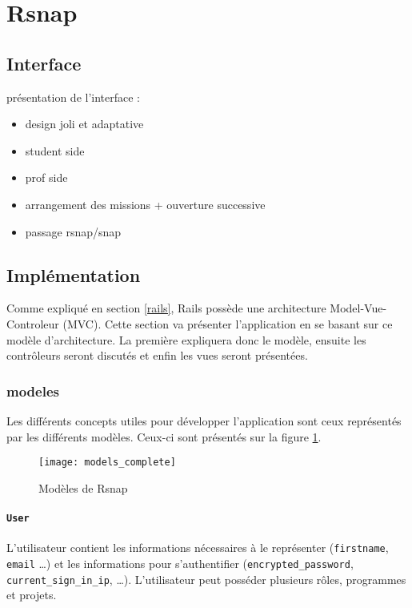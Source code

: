 \section{Rsnap}
\graphicspath{{content/7-solution/3-rsnap/images/}}

\subsection{Interface}
présentation de l'interface :
\begin{itemize}
  \item design joli et adaptative
  \item student side
  \item prof side
  \item arrangement des missions + ouverture successive
  \item passage rsnap/snap
\end{itemize}

\subsection{Implémentation}
Comme expliqué en section \ref{rails}, Rails possède une architecture Model-Vue-Controleur (MVC). Cette section va présenter l'application en se basant sur ce modèle d'architecture. La première expliquera donc le modèle, ensuite les contrôleurs seront discutés et enfin les vues seront présentées.

\subsubsection{modeles}
Les différents concepts utiles pour développer l'application sont ceux représentés par les différents modèles. Ceux-ci sont présentés sur la figure \ref{fig:models}.

\begin{figure}
 \begin{center}
   \texttt{[image: models\_complete]}
   \caption{Modèles de Rsnap}
   \label{fig:models}
 \end{center}
\end{figure}

\paragraph{\texttt{User}} L'utilisateur contient les informations nécessaires à le représenter (\texttt{firstname}, \texttt{email} \ldots) et les informations pour s'authentifier (\texttt{encrypted\_password}, \texttt{current\_sign\_in\_ip}, \ldots). L'utilisateur peut posséder plusieurs rôles, programmes et projets.


